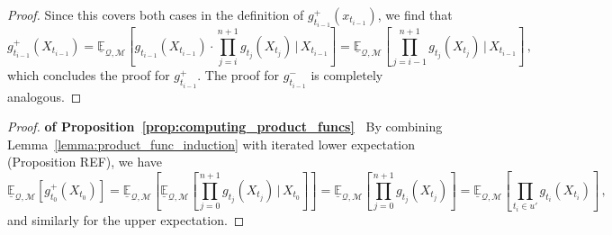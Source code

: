 \documentclass[twoside,11pt]{article}
\newcommand{\lexp}{\underline{\mathbb{E}}_{\rateset,\mathcal{M}}}
\newcommand{\rateset}{\mathcal{Q}}
\begin{document}
\begin{proof}
Since this covers both cases in the definition of $g_{t_{i-1}}^+(x_{t_{i-1}})$, we find that
\begin{equation*}
g_{t_{i-1}}^+(X_{t_{i-1}}) = \lexp\left[g_{t_{i-1}}(X_{t_{i-1}})\cdot\prod_{j=i}^{n+1}g_{t_j}(X_{t_j})\,\vert\,X_{t_{i-1}}\right] = \lexp\left[\prod_{j={i-1}}^{n+1}g_{t_j}(X_{t_j})\,\vert\,X_{t_{i-1}}\right]\,,
\end{equation*}
which concludes the proof for $g_{t_{i-1}}^+$. The proof for $g_{t_{i-1}}^-$ is completely analogous.
\end{proof}

\begin{proof}{\bf of Proposition~\ref{prop:computing_product_funcs}~}
By combining Lemma~\ref{lemma:product_func_induction} with iterated lower expectation (Proposition REF), we have
\begin{equation*}
\lexp\left[g_{t_0}^+(X_{t_0})\right] = \lexp\left[\lexp\left[\prod_{j=0}^{n+1}g_{t_j}(X_{t_j})\,\vert\,X_{t_0}\right]\right] = \lexp\left[\prod_{j=0}^{n+1}g_{t_j}(X_{t_j})\right] = \lexp\left[\prod_{t_i\in u'}g_{t_i}(X_{t_i})\right]\,,
\end{equation*}
and similarly for the upper expectation.
\end{proof}
\end{document}
